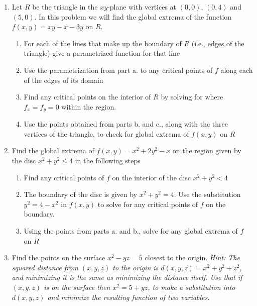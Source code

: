 \documentclass[12pt]{article}
\numberwithin{equation}{subsection}
\numberwithin{figure}{subsection}
\theoremstyle{note}
\begin{document}
{\begin{enumerate}[label=\arabic*.]
\begin{enumerate}
	\item $f(x,y)=x+3+xy+x^2$
	\item $f(x,y)=x^3-y^2$
	\item $f(x,y)=xe^y$
	\item $f(x,y)=y\sin(x)$
\end{enumerate}

\item Let $R$ be the triangle in the $xy$-plane with vertices at $(0,0)$, $(0,4)$ and $(5,0)$. In this problem we will find the global extrema of the function $f(x,y)=xy-x-3y$ on $R$.

\begin{enumerate}
	\item For each of the lines that make up the boundary of $R$ (i.e., edges of the triangle) give a parametrized function for that line
	\item Use the parametrization from part a. to any critical points of $f$ along each of the edges of its domain
	\item Find any critical points on the interior of $R$ by solving for where $f_x=f_y=0$ within the region. 
	\item Use the points obtained from parts b. and c., along with the three vertices of the triangle, to check for global extrema of $f(x,y)$ on $R$
\end{enumerate}

\item Find the global extrema of $f(x,y)=x^2+2y^2-x$ on the region given by the disc $x^2+y^2\leq 4$ in the following steps
\begin{enumerate}
	\item Find any critical points of $f$ on the interior of the disc $x^2+y^2<4$
	\item The boundary of the disc is given by $x^2+y^2=4$. Use the substitution $y^2=4-x^2$ in $f(x,y)$ to solve for any critical points of $f$ on the boundary.
	\item Using the points from parts a. and b., solve for any global extrema of $f$ on $R$
\end{enumerate}

\item Find the points on the surface $x^2-yz=5$ closest to the origin. \textit{Hint: The \textit{squared} distance from $(x,y,z)$ to the origin is $d(x,y,z)=x^2+y^2+z^2$, and minimizing it is the same as minimizing the distance itself. Use that if $(x,y,z)$ is on the surface then $x^2=5+yz$, to make a substitution into $d(x,y,z)$ and minimize the resulting function of two variables.}


\end{enumerate}}
\end{document}
